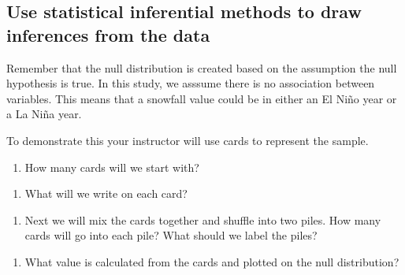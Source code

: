 \documentclass[
]{report}
\providecommand{\tightlist}{%
  \setlength{\itemsep}{0pt}\setlength{\parskip}{0pt}}
\begin{document}
\vspace{0.5in}

\newpage

\hypertarget{use-statistical-inferential-methods-to-draw-inferences-from-the-data}{%
\subsection*{Use statistical inferential methods to draw inferences from the data}\label{use-statistical-inferential-methods-to-draw-inferences-from-the-data}}

Remember that the null distribution is created based on the assumption the null hypothesis is true. In this study, we asssume there is no association between variables. This means that a snowfall value could be in either an El Ni\~{n}o year or a La Ni\~{n}a year.

To demonstrate this your instructor will use cards to represent the sample.

\begin{enumerate}
\def\labelenumi{\arabic{enumi}.}
\setcounter{enumi}{9}
\tightlist
\item
  How many cards will we start with?
\end{enumerate}

\vspace{0.5in}

\begin{enumerate}
\def\labelenumi{\arabic{enumi}.}
\setcounter{enumi}{10}
\tightlist
\item
  What will we write on each card?
\end{enumerate}

\vspace{0.5in}

\begin{enumerate}
\def\labelenumi{\arabic{enumi}.}
\setcounter{enumi}{11}
\tightlist
\item
  Next we will mix the cards together and shuffle into two piles. How many cards will go into each pile? What should we label the piles?
\end{enumerate}

\vspace{1in}

\begin{enumerate}
\def\labelenumi{\arabic{enumi}.}
\setcounter{enumi}{12}
\tightlist
\item
  What value is calculated from the cards and plotted on the null distribution?
\end{enumerate}
\end{document}
